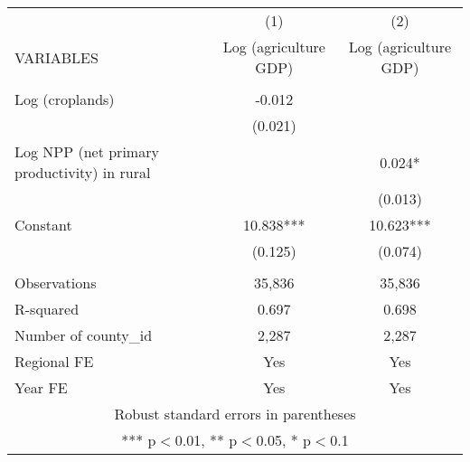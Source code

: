 \documentclass[]{article}
\begin{document}
\begin{tabular}{lcc} \hline
 & (1) & (2) \\
VARIABLES & Log (agriculture GDP) & Log (agriculture GDP) \\ \hline
 &  &  \\
Log (croplands) & -0.012 &  \\
 & (0.021) &  \\
Log NPP (net primary productivity) in rural &  & 0.024* \\
 &  & (0.013) \\
Constant & 10.838*** & 10.623*** \\
 & (0.125) & (0.074) \\
 &  &  \\
Observations & 35,836 & 35,836 \\
R-squared & 0.697 & 0.698 \\
Number of county\_id & 2,287 & 2,287 \\
Regional FE & Yes & Yes \\
 Year FE & Yes & Yes \\ \hline
\multicolumn{3}{c}{ Robust standard errors in parentheses} \\
\multicolumn{3}{c}{ *** p$<$0.01, ** p$<$0.05, * p$<$0.1} \\
\end{tabular}
\end{document}
